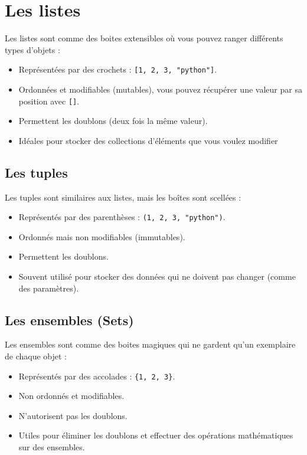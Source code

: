 \documentclass[
  letterpaper,
  DIV=11,
  numbers=noendperiod]{scrreprt}
\begin{document}
\section{Les listes}\label{les-listes}

Les listes sont comme des boites extensibles où vous pouvez ranger
différents types d'objets :

\begin{itemize}
\item
  Représentées par des crochets : \texttt{{[}1,\ 2,\ 3,\ "python"{]}}.
\item
  Ordonnées et modifiables (mutables), vous pouvez récupérer une valeur
  par sa position avec \texttt{{[}{]}}.
\item
  Permettent les doublons (deux fois la même valeur).
\item
  Idéales pour stocker des collections d'éléments que vous voulez
  modifier
\end{itemize}

\subsection{Les tuples}\label{les-tuples}

Les tuples sont similaires aux listes, mais les boîtes sont scellées :

\begin{itemize}
\item
  Représentés par des parenthèses : \texttt{(1,\ 2,\ 3,\ "python")}.
\item
  Ordonnés mais non modifiables (immutables).
\item
  Permettent les doublons.
\item
  Souvent utilisé pour stocker des données qui ne doivent pas changer
  (comme des paramètres).
\end{itemize}

\subsection{Les ensembles (Sets)}\label{les-ensembles-sets}

Les ensembles sont comme des boites magiques qui ne gardent qu'un
exemplaire de chaque objet :

\begin{itemize}
\item
  Représentés par des accolades : \texttt{\{1,\ 2,\ 3\}}.
\item
  Non ordonnés et modifiables.
\item
  N'autorisent pas les doublons.
\item
  Utiles pour éliminer les doublons et effectuer des opérations
  mathématiques sur des ensembles.
\end{itemize}
\end{document}
